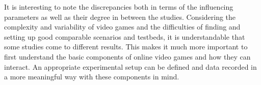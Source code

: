 It is interesting to note the discrepancies both in terms of the 
influencing parameters as well as their degree in between the studies. 
Considering the complexity and variability of video games and the 
difficulties of finding and setting up good comparable scenarios and 
testbeds, it is understandable that some studies come to different 
results. This makes it much more important to first understand the 
basic components of online video games and how they can interact. An 
appropriate experimental setup can be defined and data recorded in a 
more meaningful way with these components in mind.
















